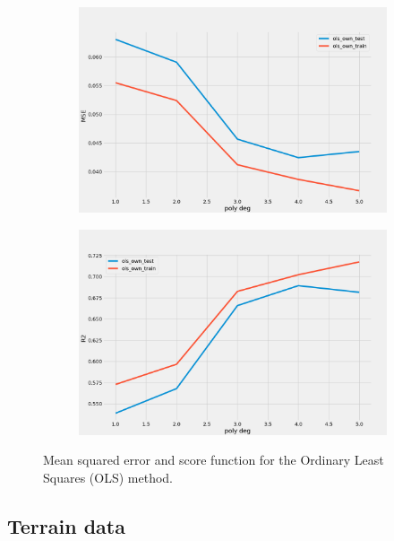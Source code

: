 \begin{figure}
     \centering
     \begin{subfigure}[b]{0.5\textwidth}
         \centering
         \includegraphics[width=\textwidth]{Figures/b_mse.png}
         \caption{}
         \label{fig:}
     \end{subfigure}%
     \hfill
     \begin{subfigure}[b]{0.5\textwidth}
         \centering
         \includegraphics[width=\textwidth]{Figures/b_r2.png}
         \caption{}
         \label{fig:}
     \end{subfigure}
        \caption{Mean squared error and score function for the Ordinary Least Squares (OLS) method. }
        \label{fig:}
\end{figure}


\subsection{Terrain data}



